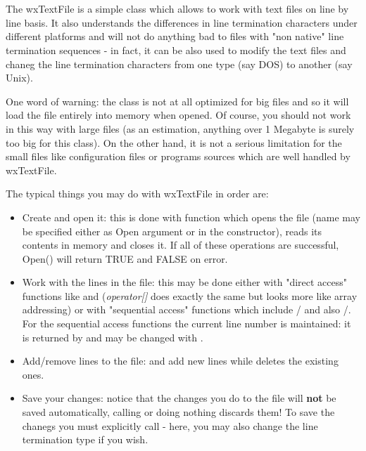 \section{}\label{wxtextfile}

The wxTextFile is a simple class which allows to work with text files on line by
line basis. It also understands the differences in line termination characters
under different platforms and will not do anything bad to files with "non
native" line termination sequences - in fact, it can be also used to modify the
text files and chaneg the line termination characters from one type (say DOS) to
another (say Unix).

One word of warning: the class is not at all optimized for big files and so it
will load the file entirely into memory when opened. Of course, you should not
work in this way with large files (as an estimation, anything over 1 Megabyte is
surely too big for this class). On the other hand, it is not a serious
limitation for the small files like configuration files or programs sources
which are well handled by wxTextFile.

The typical things you may do with wxTextFile in order are:
\begin{itemize}\itemsep=0pt
\item Create and open it: this is done with  
function which opens the file (name may be specified either as Open argument or
in the constructor), reads its contents in memory and closes it. If all of these
operations are successful, Open() will return TRUE and FALSE on error.
\item Work with the lines in the file: this may be done either with "direct
access" functions like  and
 ({\it operator[]} does exactly the same
but looks more like array addressing) or with "sequential access" functions
which include /
 and also 
/.
For the sequential access functions the current line number is maintained: it is
returned by  and may be
changed with .
\item Add/remove lines to the file:  and 
 add new lines while 
 deletes the existing ones.
\item Save your changes: notice that the changes you do to the file will {\bf
not} be saved automatically, calling  or doing
nothing discards them! To save the chanegs you must explicitly call 
 - here, you may also change the line
termination type if you wish.
\end{itemize}

